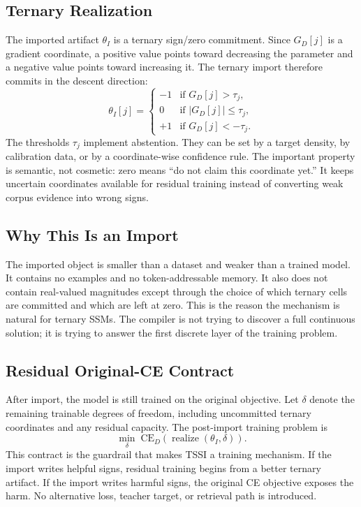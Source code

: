 \documentclass{article}
\begin{document}
\subsection{Ternary Realization}

The imported artifact $\theta_I$ is a ternary sign/zero commitment. Since
$G_D[j]$ is a gradient coordinate, a positive value points toward decreasing the
parameter and a negative value points toward increasing it. The ternary import
therefore commits in the descent direction:
\begin{equation}
  \theta_I[j] =
  \begin{cases}
    -1 & \text{if } G_D[j] > \tau_j, \\
     0 & \text{if } |G_D[j]| \leq \tau_j, \\
    +1 & \text{if } G_D[j] < -\tau_j.
  \end{cases}
\end{equation}
The thresholds $\tau_j$ implement abstention. They can be set by a target
density, by calibration data, or by a coordinate-wise confidence rule. The
important property is semantic, not cosmetic: zero means ``do not claim this
coordinate yet.'' It keeps uncertain coordinates available for residual
training instead of converting weak corpus evidence into wrong signs.

\subsection{Why This Is an Import}

The imported object is smaller than a dataset and weaker than a trained model.
It contains no examples and no token-addressable memory. It also does not
contain real-valued magnitudes except through the choice of which ternary cells
are committed and which are left at zero. This is the reason the mechanism is
natural for ternary SSMs. The compiler is not trying to discover a full
continuous solution; it is trying to answer the first discrete layer of the
training problem.

\subsection{Residual Original-CE Contract}

After import, the model is still trained on the original objective. Let
$\delta$ denote the remaining trainable degrees of freedom, including
uncommitted ternary coordinates and any residual capacity. The post-import
training problem is
\begin{equation}
  \min_\delta \; \mathrm{CE}_D(\operatorname{realize}(\theta_I, \delta)).
\end{equation}
This contract is the guardrail that makes TSSI a training mechanism. If the
import writes helpful signs, residual training begins from a better ternary
artifact. If the import writes harmful signs, the original CE objective exposes
the harm. No alternative loss, teacher target, or retrieval path is introduced.
\end{document}
